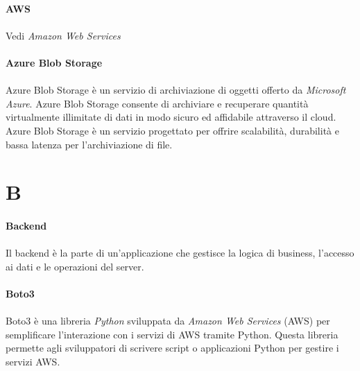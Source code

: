 \documentclass[10pt, a4paper]{article}
\begin{document}
\vspace{2em}
\paragraph{AWS}\noindent\hrulefill
\paragraph{}Vedi \textit{Amazon Web Services\pg}

\vspace{2em}
\paragraph{Azure Blob Storage}\noindent\hrulefill
\paragraph{}Azure Blob Storage è un servizio di archiviazione di oggetti offerto da \textit{Microsoft Azure\pg}. Azure Blob Storage consente di archiviare e recuperare quantità virtualmente illimitate di dati in modo sicuro ed affidabile attraverso il cloud. Azure Blob Storage è un servizio progettato per offrire scalabilità, durabilità e bassa latenza per l'archiviazione di file.


\newpage
\section{B}
\vspace{2em}
\paragraph{Backend}\noindent\hrulefill
\paragraph{}Il backend è la parte di un'applicazione che gestisce la logica di business, l'accesso ai dati e le operazioni del server.

\vspace{2em}
\paragraph{Boto3}\noindent\hrulefill
\paragraph{}Boto3 è una libreria \textit{Python\pg} sviluppata da \textit{Amazon Web Services\pg} (AWS) per semplificare l'interazione con i servizi di AWS tramite Python. Questa libreria permette agli sviluppatori di scrivere script o applicazioni Python per gestire i servizi AWS.
\end{document}
